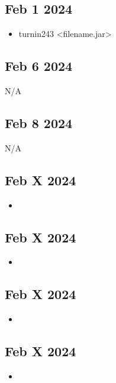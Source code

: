 \documentclass[12pt]{article}
\begin{document}
\subsection*{Feb 1 2024}

\begin{itemize}
		  \item turnin243 <filename.jar>
\end{itemize}

\subsection*{Feb 6 2024}

N/A

\subsection*{Feb 8 2024}
   	
N/A

\subsection*{Feb X 2024}

\begin{itemize}
		  \item 
\end{itemize}

\subsection*{Feb X 2024}

\begin{itemize}
		  \item 
\end{itemize}

\subsection*{Feb X 2024}

\begin{itemize}
		  \item 
\end{itemize}

\subsection*{Feb X 2024}

\begin{itemize}
		  \item 
\end{itemize}
\end{document}
